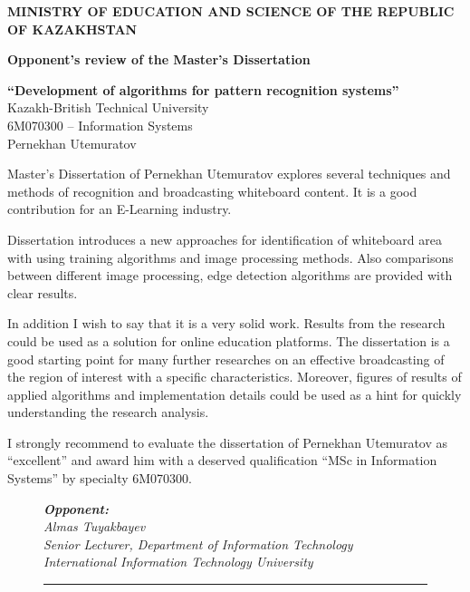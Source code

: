 \pagebreak
\thispagestyle{empty}
 \begin{centering}
        {\bf{\MakeUppercase{Ministry of education and science of the republic of Kazakhstan}}}

       \vspace{14pt}

        {\bf
        Opponent's review of the Master's Dissertation\\
        }

        \vspace{14pt}
        
        {\bf``Development of algorithms for pattern recognition systems''}\\
        {\small Kazakh-British Technical University\\
        6M070300 -- Information Systems\\
        Pernekhan Utemuratov\\}
        
        \vspace{14pt}
        
    \end{centering}
    
    Master's Dissertation of Pernekhan Utemuratov explores several techniques and methods of recognition and broadcasting whiteboard content. It is a good contribution for an E-Learning industry.
    
    Dissertation introduces a new approaches for identification of whiteboard area with using training algorithms and image processing methods. Also comparisons between different image processing, edge detection algorithms are provided with clear results. 
    
    In addition I wish to say that it is a very solid work. Results from the research could be used as a solution for online education platforms. The dissertation is a good starting point for many further researches on an effective broadcasting of the region of interest with a specific characteristics. Moreover, figures of results of applied algorithms and implementation details could be used as a hint for quickly understanding the research analysis.
    
    I strongly recommend to evaluate the dissertation of Pernekhan Utemuratov as ``excellent'' and award him with a deserved qualification ``MSc in Information Systems'' by specialty 6M070300.

        \begin{figure}[ht]
            \begin{minipage}[t]{0.7\linewidth}{\em \small
                {\bf Opponent: }\\
                Almas Tuyakbayev\\
                Senior Lecturer, Department of Information Technology\\
                International Information Technology University
                \vspace{14pt}
                
                \rule{13em}{0.4pt}\\
                }
            \end{minipage}
        \end{figure}